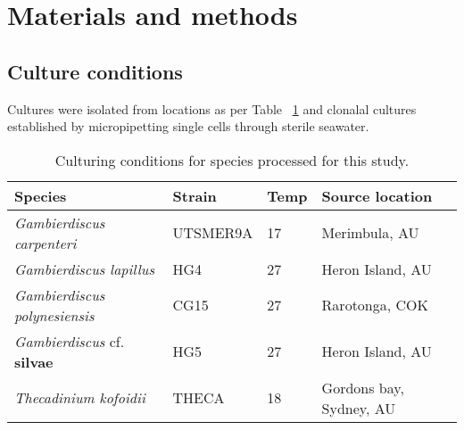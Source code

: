 \documentclass[12pt]{article}
\begin{document}
\newpage

\section{Materials and methods}
\subsection*{Culture conditions}
Cultures were isolated from locations as per Table ~\ref{tbl:strainTable} and clonalal cultures established by micropipetting single cells through sterile seawater. 

\FloatBarrier
\begin{table}
\caption{Culturing conditions for species processed for this study.}
\label{tbl:strainTable}
\begin{tabular}{ | p{3cm} | p{1.5cm} | p{1.5cm} | p{6cm} |}
\hline
\textbf{Species} & \textbf{Strain}& \textbf{Temp} & \textbf{Source location} \\
\hline
\textit{Gambierdiscus carpenteri}&UTSMER9A&17&Merimbula, AU\\
\hline
\textit{Gambierdiscus lapillus}&HG4&27&Heron Island, AU\\
\hline
\textit{Gambierdiscus polynesiensis}&CG15&27&Rarotonga, COK\\
\hline
\textit{Gambierdiscus} cf. \textbf{silvae}&HG5&27&Heron Island, AU\\
\hline
\textit{Thecadinium kofoidii}&THECA&18&Gordons bay, Sydney, AU\\
\hline
\end{tabular}
\end{table}
\FloatBarrier
\end{document}
